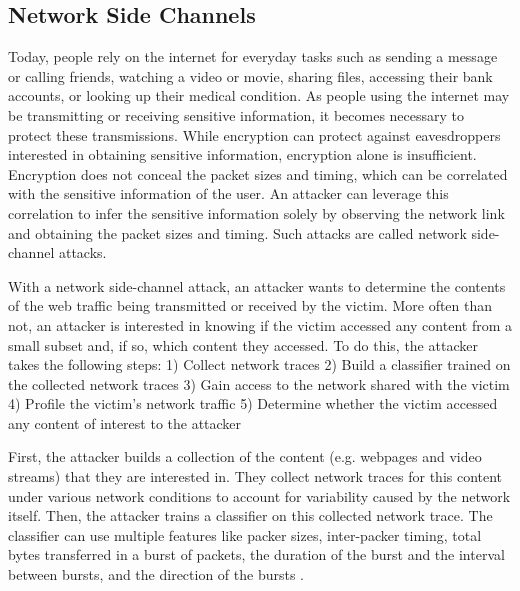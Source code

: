 \subsection{Network Side Channels}
\label{subsec:netshaper-background-network-side-channels}

Today, people rely on the internet for everyday tasks such as sending a message or calling friends, watching a video or movie, sharing files, accessing their bank accounts, or looking up their medical condition.
As people using the internet may be transmitting or receiving sensitive information, it becomes necessary to protect these transmissions.
While encryption can protect against eavesdroppers interested in obtaining sensitive information, encryption alone is insufficient.
Encryption does not conceal the packet sizes and timing, which can be correlated with the sensitive information of the user. 
An attacker can leverage this correlation to infer the sensitive information solely by observing the network link and obtaining the packet sizes and timing.
Such attacks are called network side-channel attacks.

With a network side-channel attack, an attacker wants to determine the contents of the web traffic being transmitted or received by the victim.
More often than not, an attacker is interested in knowing if the victim accessed any content from a small subset and, if so, which content they accessed.
To do this, the attacker takes the following steps: 
1) Collect network traces
2) Build a classifier trained on the collected network traces
3) Gain access to the network shared with the victim
4) Profile the victim's network traffic
5) Determine whether the victim accessed any content of interest to the attacker

First, the attacker builds a collection of the content (e.g. webpages and video streams) that they are interested in. 
They collect network traces for this content under various network conditions to account for variability caused by the network itself. 
Then, the attacker trains a classifier on this collected network trace.
The classifier can use multiple features like packer sizes, inter-packer timing, total bytes transferred in a burst of packets, the duration of the burst and the interval between bursts, and the direction of the bursts \cite{schuster2017beautyburst}.

